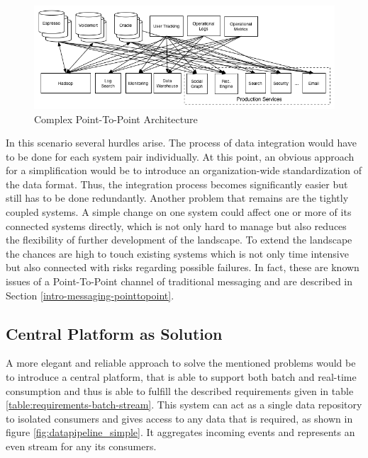 \begin{figure}[H]
    \centering
    \includegraphics[width=1.0\textwidth]{images/datapipeline_complex.png}
    \caption{Complex Point-To-Point Architecture}
    \label{fig:datapipeline_complex}
\end{figure}

In this scenario several hurdles arise. The process of data integration would
have to be done for each system pair individually. At this point, an obvious
approach for a simplification would be to introduce an organization-wide
standardization of the data format. Thus, the integration process becomes 
significantly easier but still has to be done redundantly. Another problem that
remains are the tightly coupled systems. A simple change on one system could
affect one or more of its connected systems directly, which is not only hard to
manage but also reduces the flexibility of further development of the landscape.
To extend the landscape the chances are high to touch existing systems which is
not only time intensive but also connected with risks regarding possible
failures. In fact, these are known issues of a Point-To-Point channel of
traditional messaging and are described in Section
\ref{intro-messaging-pointtopoint}.

\subsection{Central Platform as Solution}
\label{intro-datastream-centralplatform}
A more elegant and reliable approach to solve the mentioned problems would be to
introduce a central platform, that is able to support both batch and real-time
consumption and thus is able to fulfill the described requirements given in table
\ref{table:requirements-batch-stream}. This system can act as a single
data repository to isolated consumers and gives access to any data that is
required, as shown in figure \ref{fig:datapipeline_simple}. It aggregates
incoming events and represents an even stream for any its consumers. 

